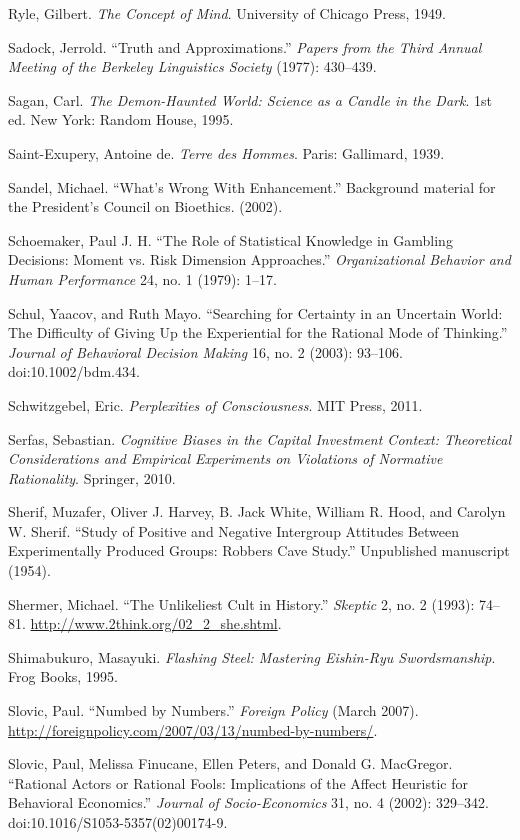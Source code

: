 \documentclass[letterpaper]{book}
\begin{document}
{
 Ryle, Gilbert. \textit{The Concept of Mind}. University of Chicago
Press, 1949.}

{
 Sadock, Jerrold. ``Truth and
Approximations.'' \textit{Papers from the Third
Annual Meeting of the Berkeley Linguistics Society} (1977): 430--439.}

{
 Sagan, Carl. \textit{The Demon-Haunted World: Science as a Candle
in the Dark}. 1st ed. New York: Random House, 1995.}

{
 Saint-Exupery, Antoine de. \textit{Terre des Hommes}. Paris:
Gallimard, 1939.}

{
 Sandel, Michael. ``What's Wrong
With Enhancement.'' Background material for the
President's Council on Bioethics. (2002).}

{
 Schoemaker, Paul J. H. ``The Role of Statistical
Knowledge in Gambling Decisions: Moment vs. Risk Dimension
Approaches.'' \textit{Organizational Behavior and
Human Performance} 24, no. 1 (1979): 1--17.}

{
 Schul, Yaacov, and Ruth Mayo. ``Searching for
Certainty in an Uncertain World: The Difficulty of Giving Up the
Experiential for the Rational Mode of Thinking.''
\textit{Journal of Behavioral Decision Making} 16, no. 2 (2003):
93--106. doi:10.1002/bdm.434.}

{
 Schwitzgebel, Eric. \textit{Perplexities of Consciousness}. MIT
Press, 2011.}

{
 Serfas, Sebastian. \textit{Cognitive Biases in the Capital
Investment Context: Theoretical Considerations and Empirical
Experiments on Violations of Normative Rationality}. Springer, 2010.}

{
 Sherif, Muzafer, Oliver J. Harvey, B. Jack White, William R. Hood,
and Carolyn W. Sherif. ``Study of Positive and
Negative Intergroup Attitudes Between Experimentally Produced Groups:
Robbers Cave Study.'' Unpublished manuscript (1954).}

{
 Shermer, Michael. ``The Unlikeliest Cult in
History.'' \textit{Skeptic} 2, no. 2 (1993): 74--81.
\url{http://www.2think.org/02\_2\_she.shtml}.}

{
 Shimabukuro, Masayuki. \textit{Flashing Steel: Mastering
Eishin-Ryu Swordsmanship}. Frog Books, 1995.}

{
 Slovic, Paul. ``Numbed by
Numbers.'' \textit{Foreign Policy} (March 2007).
\url{http://foreignpolicy.com/2007/03/13/numbed-by-numbers/}.}

{
 Slovic, Paul, Melissa Finucane, Ellen Peters, and Donald G.
MacGregor. ``Rational Actors or Rational Fools:
Implications of the Affect Heuristic for Behavioral
Economics.'' \textit{Journal of Socio-Economics} 31,
no. 4 (2002): 329--342. doi:10.1016/S1053-5357(02)00174-9.}
\end{document}
